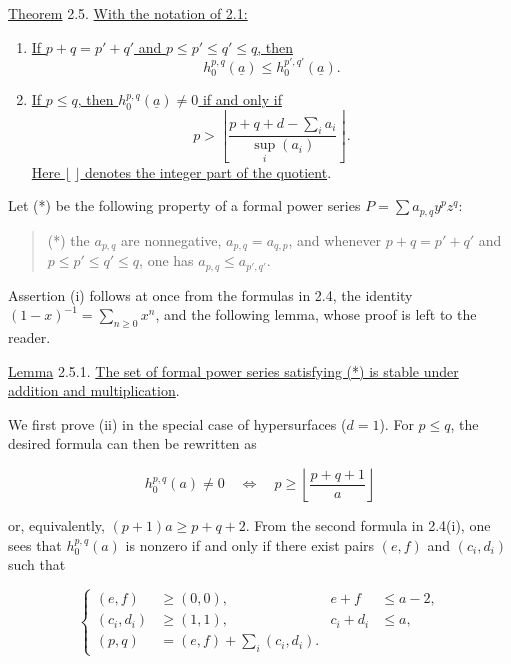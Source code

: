 \underline{Theorem} 2.5. \underline{With the notation of 2.1:}

\begin{enumerate}[label=(\roman*),leftmargin=2.6em]
\item \underline{If $p+q=p'+q'$ and
$p\leq p'\leq q'\leq q$, then}
\begin{equation*}
h_0^{p,q}(\underline a)\leq h_0^{p',q'}(\underline a).
\end{equation*}

\item \underline{If $p\leq q$, then $h_0^{p,q}(\underline a)\ne0$ if
and only if}
\begin{equation*}
p>\left\lfloor
\frac{p+q+d-\sum_i a_i}{\sup_i(a_i)}
\right\rfloor.
\end{equation*}
\underline{Here $\lfloor\ \rfloor$ denotes the integer part of the
quotient}.
\end{enumerate}


Let (*) be the following property of a formal power series
$P=\sum a_{p,q}y^pz^q$:

\begin{quote}
(*) the $a_{p,q}$ are nonnegative, $a_{p,q}=a_{q,p}$, and whenever
$p+q=p'+q'$ and $p\leq p'\leq q'\leq q$, one has
$a_{p,q}\leq a_{p',q'}$.
\end{quote}

Assertion (i) follows at once from the formulas in 2.4, the identity
$(1-x)^{-1}=\sum_{n\geq0}x^n$, and the following lemma, whose proof is left
to the reader.

\underline{Lemma} 2.5.1. \underline{The set of formal power series
satisfying (*) is stable under addition and multiplication}.

We first prove (ii) in the special case of hypersurfaces ($d=1$).  For
$p\leq q$, the desired formula can then be rewritten as

\begin{equation}\tag{2.5.2}
h_0^{p,q}(a)\ne0
\quad\Longleftrightarrow\quad
p\geq\left\lfloor\frac{p+q+1}{a}\right\rfloor
\end{equation}

or, equivalently, $(p+1)a\geq p+q+2$.  From the second formula in 2.4(i),
one sees that $h_0^{p,q}(a)$ is nonzero if and only if there exist pairs
$(e,f)$ and $(c_i,d_i)$ such that

\begin{equation}\tag{2.5.3}
\left\{
\begin{aligned}
(e,f)&\geq(0,0),& e+f&\leq a-2,\\
(c_i,d_i)&\geq(1,1),& c_i+d_i&\leq a,\\
(p,q)&=(e,f)+\sum_i(c_i,d_i).&&
\end{aligned}
\right.
\end{equation}


